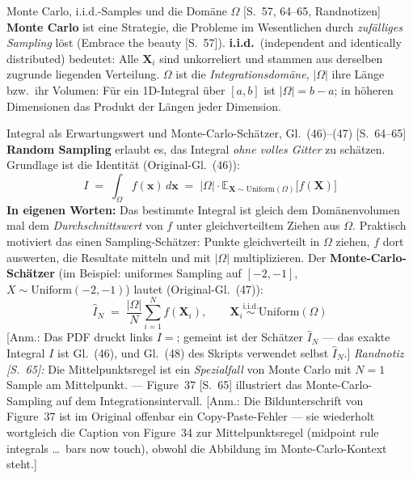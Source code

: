 \begin{defbox}{Monte Carlo, i.i.d.-Samples und die Domäne $\Omega$ [S.~57, 64--65, Randnotizen]}
\textbf{Monte Carlo} ist eine Strategie, die Probleme im Wesentlichen durch
\emph{zufälliges Sampling} löst (\glqq Embrace the beauty\grqq{} [S.~57]).
\textbf{i.i.d.}\ (independent and identically distributed) bedeutet: Alle
$\mathbf{X}_i$ sind unkorreliert und stammen aus derselben zugrunde liegenden
Verteilung. $\Omega$ ist die \emph{Integrationsdomäne}, $|\Omega|$ ihre Länge bzw.\
ihr Volumen: Für ein 1D-Integral über $[a,b]$ ist $|\Omega| = b - a$; in höheren
Dimensionen das Produkt der Längen jeder Dimension.
\end{defbox}

\begin{satzbox}{Integral als Erwartungswert und Monte-Carlo-Schätzer, Gl.~(46)--(47) [S.~64--65]}
\textbf{Random Sampling} erlaubt es, das Integral \emph{ohne volles Gitter} zu
schätzen. Grundlage ist die Identität (Original-Gl.~(46)):
\[
  I \;=\; \int_\Omega f(\mathbf{x})\,d\mathbf{x}
    \;=\; |\Omega| \cdot \mathbb{E}_{\mathbf{X}\sim\mathrm{Uniform}(\Omega)}\bigl[f(\mathbf{X})\bigr] \tag{46}
\]
\textbf{In eigenen Worten:} Das bestimmte Integral ist gleich dem Domänenvolumen mal
dem \emph{Durchschnittswert} von $f$ unter gleichverteiltem Ziehen aus $\Omega$.
Praktisch motiviert das einen Sampling-Schätzer: Punkte gleichverteilt in $\Omega$
ziehen, $f$ dort auswerten, die Resultate mitteln und mit $|\Omega|$ multiplizieren.
Der \textbf{Monte-Carlo-Schätzer} (im Beispiel: uniformes Sampling auf $[-2,-1]$,
$X \sim \mathrm{Uniform}(-2,-1)$) lautet (Original-Gl.~(47)):
\[
  \hat{I}_N \;=\; \frac{|\Omega|}{N}\sum_{i=1}^{N} f(\mathbf{X}_i), \qquad
  \mathbf{X}_i \overset{\text{i.i.d.}}{\sim} \mathrm{Uniform}(\Omega) \tag{47}
\]
[Anm.: Das PDF druckt links \glqq$I =$\grqq; gemeint ist der Schätzer $\hat{I}_N$ --- das exakte Integral $I$ ist Gl.~(46), und Gl.~(48) des Skripts verwendet selbst $\hat{I}_N$.]
\emph{Randnotiz [S.~65]:} Die Mittelpunktsregel ist ein \emph{Spezialfall} von Monte
Carlo mit $N = 1$ Sample am Mittelpunkt. --- Figure~37 [S.~65] illustriert das
Monte-Carlo-Sampling auf dem Integrationsintervall. [Anm.: Die Bildunterschrift von
Figure~37 ist im Original offenbar ein Copy-Paste-Fehler --- sie wiederholt wortgleich
die Caption von Figure~34 zur Mittelpunktsregel (\glqq midpoint rule integrals \ldots\
bars now touch\grqq), obwohl die Abbildung im Monte-Carlo-Kontext steht.]
\end{satzbox}

